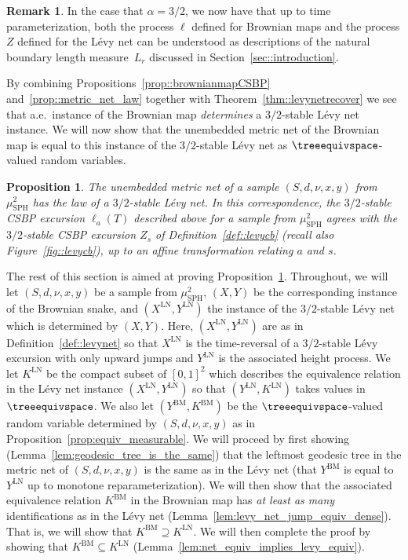 \documentclass[JEP,XML,SOM,Unicode]{cedram}
\theoremstyle{plain}
\numberwithin{theorem}{section}
\newtheorem{proposition}[theorem]{Proposition}
\theoremstyle{definition}
\newtheorem{remark}[theorem]{Remark}
\newcommand{\mustwo}{\mu_{\mathrm{SPH}}^2}
\begin{document}
\begin{remark}
\label{rem::brownian_map_boundary_length}
In the case that $\alpha = 3/2$, we now have that up to time parameterization, both the process $\ell$ defined for Brownian maps and the process $Z$ defined for the Lévy net can be understood as descriptions of the natural boundary length measure~$L_{r}$ discussed in Section~\ref{sec::introduction}.
\end{remark}

By combining Propositions~\ref{prop::brownianmapCSBP} and~\ref{prop::metric_net_law} together with Theorem~\ref{thm::levynetrecover} we see that a.e.\ instance of the Brownian map \emph{determines} a $3/2$-stable Lévy net instance. We will now show that the unembedded metric net of the Brownian map is equal to this instance of the $3/2$-stable Lévy net as $\treeequivspace$-valued random variables.

\begin{proposition}
\label{prop:metric_net_equivalent}
The unembedded metric net of a sample $(S,d,\nu,x,y)$ from $\mustwo$ has the law of a $3/2$-stable Lévy net. In this correspondence, the $3/2$-stable CSBP excursion $\ell_a(T)$ described above for a sample from $\mustwo$ agrees with the $3/2$-stable CSBP excursion $Z_s$ of Definition~\ref{def::levycb} (recall also Figure~\ref{fig::levycb}), up to an affine transformation relating $a$ and $s$.
\end{proposition}

\newcommand{\LN}{\mathrm{LN}}
\newcommand{\BM}{\mathrm{BM}}

The rest of this section is aimed at proving Proposition~\ref{prop:metric_net_equivalent}. Throughout, we will let $(S,d,\nu,x,y)$ be a sample from $\mustwo$, $(X,Y)$ be the corresponding instance of the Brownian snake, and $(X^\LN,Y^\LN)$ the instance of the $3/2$-stable Lévy net which is determined by $(X,Y)$. Here, $(X^\LN,Y^\LN)$ are as in Definition~\ref{def::levynet} so that $X^\LN$ is the time-reversal of a $3/2$-stable Lévy excursion with only upward jumps and $Y^\LN$ is the associated height process. We let $K^\LN$ be the compact subset of $[0,1]^2$ which describes the equivalence relation in the Lévy net instance $(X^\LN,Y^\LN)$ so that $(Y^\LN,K^\LN)$ takes values in $\treeequivspace$. We also let $(Y^\BM,K^\BM)$ be the $\treeequivspace$-valued random variable determined by $(S,d,\nu,x,y)$ as in Proposition~\ref{prop:equiv_measurable}. We will proceed by first showing (Lemma~\ref{lem:geodesic_tree_is_the_same}) that the leftmost geodesic tree in the metric net of $(S,d,\nu,x,y)$ is the same as in the Lévy net (\ie that $Y^\BM$ is equal to $Y^\LN$ up to monotone reparameterization). We will then show that the associated equivalence relation $K^\BM$ in the Brownian map has \emph{at least as many} identifications as in the Lévy net (Lemma~\ref{lem:levy_net_jump_equiv_dense}). That is, we will show that $K^\BM \supseteq K^\LN$. We will then complete the proof by showing that $K^\BM \subseteq K^\LN$ (Lemma~\ref{lem:net_equiv_implies_levy_equiv}).
\end{document}
